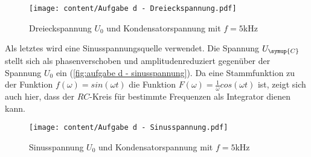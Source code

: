 \begin{figure}
  \centering
  \texttt{[image: content/Aufgabe d - Dreieckspannung.pdf]}
  \caption{Dreieckspannung $U_{0}$ und Kondensatorspannung mit $f=5$kHz}
  \label{fig:aufgabe d - dreieckspannung}
\end{figure}

Als letztes wird eine Sinusspannungsquelle verwendet. Die Spannung $U_{\symup{C}}$ stellt sich als phasenverschoben
und amplitudenreduziert gegenüber der Spannung $U_{0}$ ein (\autoref{fig:aufgabe d - sinusspannung}). Da eine
Stammfunktion zu der Funktion $f(\omega)=sin(\omega t)$ die Funktion $F(\omega) = \frac{1}{\omega}cos(\omega t)$ ist,
zeigt sich auch hier, dass der $RC$-Kreis für bestimmte Frequenzen als Integrator dienen kann.

\begin{figure}
  \centering
  \texttt{[image: content/Aufgabe d - Sinusspannung.pdf]}
  \caption{Sinusspannung $U_{0}$ und Kondensatorspannung mit $f=5$kHz}
  \label{fig:aufgabe d - sinusspannung}
\end{figure}

